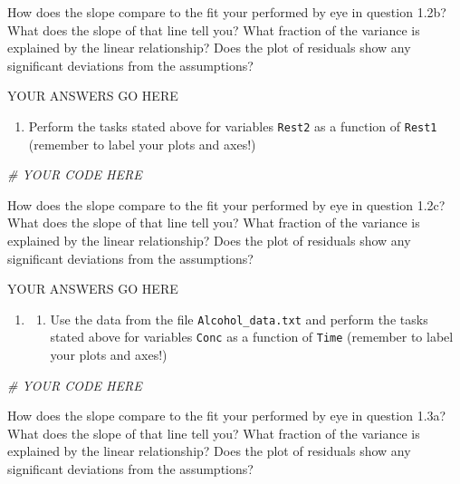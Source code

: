 \documentclass[
]{book}
\newenvironment{Shaded}{\begin{snugshade}}{\end{snugshade}}
\newcommand{\CommentTok}[1]{\textcolor[rgb]{0.56,0.35,0.01}{\textit{#1}}}
\providecommand{\tightlist}{%
  \setlength{\itemsep}{0pt}\setlength{\parskip}{0pt}}
\theoremstyle{definition}
\theoremstyle{definition}
\theoremstyle{definition}
\theoremstyle{remark}
\begin{document}
How does the slope compare to the fit your performed by eye in question 1.2b? What does the slope of that line tell you? What fraction of the variance is explained by the linear relationship? Does the plot of residuals show any significant deviations from the assumptions?

YOUR ANSWERS GO HERE

\begin{enumerate}
\def\labelenumi{\alph{enumi})}
\setcounter{enumi}{1}
\tightlist
\item
  Perform the tasks stated above for variables \texttt{Rest2} as a function of \texttt{Rest1} (remember to label your plots and axes!)
\end{enumerate}

\begin{Shaded}
\begin{Highlighting}[]
\CommentTok{\# YOUR CODE HERE}
\end{Highlighting}
\end{Shaded}

How does the slope compare to the fit your performed by eye in question 1.2c? What does the slope of that line tell you? What fraction of the variance is explained by the linear relationship? Does the plot of residuals show any significant deviations from the assumptions?

YOUR ANSWERS GO HERE

\begin{enumerate}
\def\labelenumi{\arabic{enumi}.}
\setcounter{enumi}{2}
\item
  \begin{enumerate}
  \def\labelenumii{\alph{enumii})}
  \tightlist
  \item
    Use the data from the file \texttt{Alcohol\_data.txt} and perform the tasks stated above for variables \texttt{Conc} as a function of \texttt{Time} (remember to label your plots and axes!)
  \end{enumerate}
\end{enumerate}

\begin{Shaded}
\begin{Highlighting}[]
\CommentTok{\# YOUR CODE HERE}
\end{Highlighting}
\end{Shaded}

How does the slope compare to the fit your performed by eye in question 1.3a? What does the slope of that line tell you? What fraction of the variance is explained by the linear relationship? Does the plot of residuals show any significant deviations from the assumptions?
\end{document}
